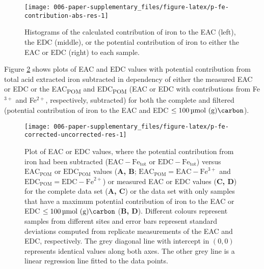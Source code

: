 \documentclass[draft,linenumbers]{agujournal2018}
\begin{document}
\begin{figure}[H]

{\centering \texttt{[image: 006-paper-supplementary\_files/figure-latex/p-fe-contribution-abs-res-1]} 

}

\caption{Histograms of the calculated contribution of iron to the EAC (left), the EDC (middle), or the potential contribution of iron to either the EAC or EDC (right) to each sample.}\label{fig:p-fe-contribution-abs-res}
\end{figure}

\clearpage

Figure \ref{fig:p-fe-corrected-uncorrected-res} shows plots of EAC and
EDC values with potential contribution from total acid extracted iron
subtracted in dependency of either the measured EAC or EDC or the
EAC\textsubscript{POM} and EDC\textsubscript{POM} (EAC or EDC with
contributions from Fe\(^{3+}\) and Fe\(^{2+}\), respectively,
subtracted) for both the complete and filtered (potential contribution
of iron to the EAC and EDC \(\le \SI{100}{\micro\mol\of\gram\carbon}\)).

\begin{figure}[H]

{\centering \texttt{[image: 006-paper-supplementary\_files/figure-latex/p-fe-corrected-uncorrected-res-1]} 

}

\caption{Plot of EAC or EDC values, where the potential contribution from iron had been subtracted ($\text{EAC} - \text{Fe}_\text{tot}$ or $\text{EDC} - \text{Fe}_\text{tot}$) versus $\text{EAC}_\text{POM}$ or $\text{EDC}_\text{POM}$ values (\textbf{A, B}; $\text{EAC}_\text{POM} = \text{EAC} - \text{Fe}^{3+}$ and $\text{EDC}_\text{POM} = \text{EDC} - \text{Fe}^{2+}$) or measured EAC or EDC values (\textbf{C, D}) for the complete data set (\textbf{A, C}) or the data set with only samples that have a maximum potential contribution of iron to the EAC or EDC $\le \SI{100}{\micro\mol\of\gram\carbon}$ (\textbf{B, D}). Different colours represent samples from different sites and error bars represent standard deviations computed from replicate measurements of the EAC and EDC, respectively. The grey diagonal line with intercept in $(0,0)$ represents identical values along both axes. The other grey line is a linear regression line fitted to the data points.}\label{fig:p-fe-corrected-uncorrected-res}
\end{figure}
\end{document}
